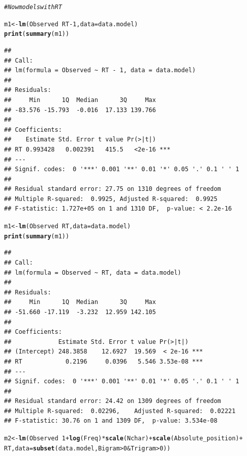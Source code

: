 \documentclass{article}\usepackage[]{graphicx}\usepackage[]{color}
\makeatletter
\newcommand{\hlnum}[1]{\textcolor[rgb]{0.686,0.059,0.569}{#1}}%
\newcommand{\hlcom}[1]{\textcolor[rgb]{0.678,0.584,0.686}{\textit{#1}}}%
\newcommand{\hlopt}[1]{\textcolor[rgb]{0,0,0}{#1}}%
\newcommand{\hlstd}[1]{\textcolor[rgb]{0.345,0.345,0.345}{#1}}%
\newcommand{\hlkwb}[1]{\textcolor[rgb]{0.69,0.353,0.396}{#1}}%
\newcommand{\hlkwc}[1]{\textcolor[rgb]{0.333,0.667,0.333}{#1}}%
\newcommand{\hlkwd}[1]{\textcolor[rgb]{0.737,0.353,0.396}{\textbf{#1}}}%
\newenvironment{kframe}{%
 \def\at@end@of@kframe{}%
 \ifinner\ifhmode%
  \def\at@end@of@kframe{\end{minipage}}%
  \begin{minipage}{\columnwidth}%
 \fi\fi%
 \def\FrameCommand##1{\hskip\@totalleftmargin \hskip-\fboxsep
 \colorbox{shadecolor}{##1}\hskip-\fboxsep
     \hskip-\linewidth \hskip-\@totalleftmargin \hskip\columnwidth}%
 \MakeFramed {\advance\hsize-\width
   \@totalleftmargin\z@ \linewidth\hsize
   \@setminipage}}%
 {\par\unskip\endMakeFramed%
 \at@end@of@kframe}
\newenvironment{knitrout}{}{} %
\makeatother
\begin{document}
\begin{knitrout}
\color{fgcolor}\begin{kframe}
\begin{alltt}
\hlcom{# Now models with RT}

\hlstd{m1} \hlkwb{<-} \hlkwd{lm}\hlstd{(Observed} \hlopt{~} \hlstd{RT} \hlopt{-} \hlnum{1}\hlstd{,} \hlkwc{data} \hlstd{= data.model)}
\hlkwd{print}\hlstd{(}\hlkwd{summary}\hlstd{(m1))}
\end{alltt}
\begin{verbatim}
## 
## Call:
## lm(formula = Observed ~ RT - 1, data = data.model)
## 
## Residuals:
##     Min      1Q  Median      3Q     Max 
## -83.576 -15.793  -0.016  17.133 139.766 
## 
## Coefficients:
##    Estimate Std. Error t value Pr(>|t|)    
## RT 0.993428   0.002391   415.5   <2e-16 ***
## ---
## Signif. codes:  0 '***' 0.001 '**' 0.01 '*' 0.05 '.' 0.1 ' ' 1
## 
## Residual standard error: 27.75 on 1310 degrees of freedom
## Multiple R-squared:  0.9925,	Adjusted R-squared:  0.9925 
## F-statistic: 1.727e+05 on 1 and 1310 DF,  p-value: < 2.2e-16
\end{verbatim}
\begin{alltt}
\hlstd{m1} \hlkwb{<-} \hlkwd{lm}\hlstd{(Observed} \hlopt{~} \hlstd{RT,} \hlkwc{data} \hlstd{= data.model)}
\hlkwd{print}\hlstd{(}\hlkwd{summary}\hlstd{(m1))}
\end{alltt}
\begin{verbatim}
## 
## Call:
## lm(formula = Observed ~ RT, data = data.model)
## 
## Residuals:
##     Min      1Q  Median      3Q     Max 
## -51.660 -17.119  -3.232  12.959 142.105 
## 
## Coefficients:
##             Estimate Std. Error t value Pr(>|t|)    
## (Intercept) 248.3858    12.6927  19.569  < 2e-16 ***
## RT            0.2196     0.0396   5.546 3.53e-08 ***
## ---
## Signif. codes:  0 '***' 0.001 '**' 0.01 '*' 0.05 '.' 0.1 ' ' 1
## 
## Residual standard error: 24.42 on 1309 degrees of freedom
## Multiple R-squared:  0.02296,	Adjusted R-squared:  0.02221 
## F-statistic: 30.76 on 1 and 1309 DF,  p-value: 3.534e-08
\end{verbatim}
\begin{alltt}
\hlstd{m2} \hlkwb{<-} \hlkwd{lm}\hlstd{(Observed} \hlopt{~} \hlnum{1} \hlopt{+} \hlkwd{log}\hlstd{(Freq)} \hlopt{*} \hlkwd{scale}\hlstd{(Nchar)} \hlopt{+} \hlkwd{scale}\hlstd{(Absolute_position)} \hlopt{+}
    \hlstd{RT,} \hlkwc{data} \hlstd{=} \hlkwd{subset}\hlstd{(data.model, Bigram} \hlopt{>} \hlnum{0} \hlopt{&} \hlstd{Trigram} \hlopt{>} \hlnum{0}\hlstd{))}

\end{alltt}
\end{kframe}
\end{knitrout}
\end{document}
